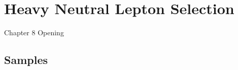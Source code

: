 \chapter{Heavy Neutral Lepton Selection}
\label{ChapterSelection}

\ifpdf
    \graphicspath{{Chapter8/Figs/Raster/}{Chapter8/Figs/PDF/}{Chapter8/Figs/}}
\else
    \graphicspath{{Chapter8/Figs/Vector/}{Chapter8/Figs/}}
\fi


Chapter 8 Opening
\newpage

\section{Samples}
